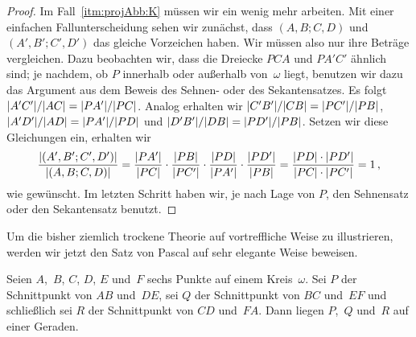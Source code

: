 \begin{proof}
	Im Fall~\ref{itm:projAbb:K} müssen wir ein wenig mehr arbeiten. Mit einer einfachen Fallunterscheidung sehen wir zunächst, dass $(A,B;C,D)$ und $(A',B';C',D')$ das gleiche Vorzeichen haben. Wir müssen also nur ihre Beträge vergleichen. Dazu beobachten wir, dass die Dreiecke $PCA$ und $PA'C'$ ähnlich sind; je nachdem, ob $P$ innerhalb oder außerhalb von~$\omega$ liegt, benutzen wir dazu das Argument aus dem Beweis des Sehnen- oder des Sekantensatzes. Es folgt $\lvert A'C'\rvert/\lvert AC\rvert=\lvert PA'\rvert/\lvert PC\rvert$. Analog erhalten wir $\lvert C'B'\rvert/\lvert CB\rvert=\lvert PC'\rvert/\lvert PB\rvert$, $\lvert A'D'\rvert/\lvert AD\rvert=\lvert PA'\rvert/\lvert PD\rvert$ und $\lvert D'B'\rvert/\lvert DB\rvert=\lvert PD'\rvert/\lvert PB\rvert$. Setzen wir diese Gleichungen ein, erhalten wir
	\begin{equation*}
		\frac{\lvert(A',B';C',D')\rvert}{\lvert(A,B;C,D)\rvert}=\frac{\lvert PA'\rvert}{\lvert PC\rvert}\cdot \frac{\lvert PB\rvert}{\lvert PC'\rvert}\cdot \frac{\lvert PD\rvert}{\lvert PA'\rvert}\cdot\frac{\lvert PD'\rvert}{\lvert PB\rvert}=\frac{\lvert PD\rvert\cdot\lvert PD'\rvert}{\lvert PC\rvert\cdot \lvert PC'\rvert}=1\,,
	\end{equation*}
	wie gewünscht. Im letzten Schritt haben wir, je nach Lage von $P$, den Sehnensatz oder den Sekantensatz benutzt.
\end{proof}

Um die bisher ziemlich trockene Theorie auf vortreffliche Weise zu illustrieren, werden wir jetzt den Satz von Pascal auf sehr elegante Weise beweisen.

\begin{satzmitnamen}
	Seien $A$,~$B$, $C$, $D$, $E$ und~$F$ sechs Punkte auf einem Kreis~$\omega$. Sei $P$ der Schnittpunkt von $AB$ und~$DE$, sei $Q$ der Schnittpunkt von $BC$ und~$EF$ und schließlich sei $R$ der Schnittpunkt von $CD$ und~$FA$. Dann liegen $P$,~$Q$ und~$R$ auf einer Geraden.
\end{satzmitnamen}


